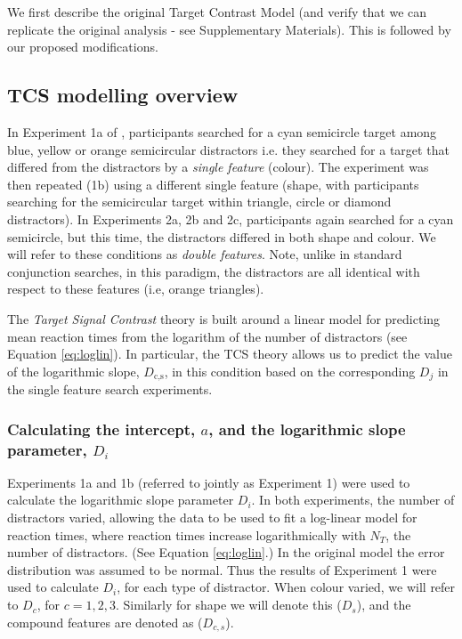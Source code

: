 \documentclass[smallextended, natbib]{svjour3}       %
\begin{document}
We first describe the original Target Contrast Model (and verify that we can replicate the original analysis - see Supplementary Materials). This is followed by our proposed modifications.

\subsection{TCS modelling overview} 

In Experiment 1a of \cite{buetti2019predicting}, participants searched for a cyan semicircle target among blue, yellow or orange semicircular distractors i.e. they searched for a target that differed from the distractors by a \textit{single feature} (colour). The experiment was then repeated (1b) using a different single feature (shape, with participants searching for the semicircular target within triangle, circle or diamond distractors). In Experiments 2a, 2b and 2c, participants again searched for a cyan semicircle, but this time, the distractors differed in both shape and colour. We will refer to these conditions as \textit{double features}. Note, unlike in standard conjunction searches, in this paradigm, the distractors are all identical with respect to these features (i.e, orange triangles). 

The \textit{Target Signal Contrast} theory is built around a linear model for predicting mean reaction times from the logarithm of the number of distractors (see Equation \ref{eq:loglin}). In particular, the TCS theory allows us to predict the value of the logarithmic slope, $D_\text{c,s}$, in this condition based on the corresponding $D_j$ in the single feature search experiments. 

\subsubsection{Calculating the intercept, $a$, and the logarithmic slope parameter, $D_i$}
\label{sec:fitting_D}

Experiments 1a and 1b (referred to jointly as Experiment 1) were used to calculate the logarithmic slope parameter $D_i$. In both experiments, the number of distractors varied, allowing the data to be used to fit a log-linear model for reaction times, where reaction times increase logarithmically with $N_T$, the number of distractors. (See Equation \ref{eq:loglin}.) In the original model the error distribution was assumed to be normal. Thus the results of Experiment 1 were used to calculate $D_i$, for each type of distractor. When colour varied, we will refer to $D_c$, for $c=1,2,3$. Similarly for shape we will denote this ($D_s$), and the compound features are denoted as ($D_{c,s}$). 
\end{document}
